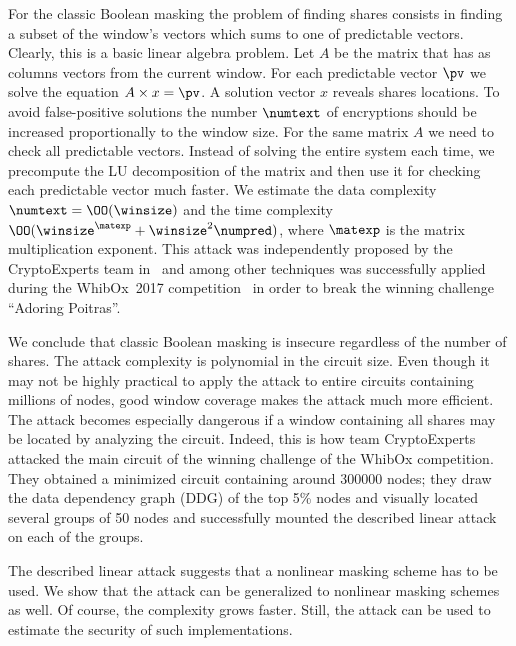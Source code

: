 

For the classic Boolean masking the problem of finding shares consists in finding a subset of the window's vectors which sums to one of predictable vectors. Clearly, this is a basic linear algebra problem. Let $A$ be the matrix that has as columns vectors from the current window. For each predictable vector $\pv$ we solve the equation $A \times x = \pv$. A solution vector $x$ reveals shares locations. To avoid false-positive solutions the number $\numtext$ of encryptions should be increased proportionally to the window size. For the same matrix $A$ we need to check all predictable vectors. Instead of solving the entire system each time, we precompute the LU decomposition of the matrix and then use it for checking each predictable vector much faster. We estimate the data complexity $\numtext = \OO(\winsize)$ and the time complexity $\OO(\winsize^\matexp + \winsize^2\numpred)$, where $\matexp$ is the matrix multiplication exponent. This attack was independently proposed by the CryptoExperts team in~\cite{cryptoexperts} and among other techniques was successfully applied~\cite{CHESawards} during the WhibOx~2017 competition~\cite{whibox} in order to break the winning challenge ``Adoring Poitras''.

We conclude that classic Boolean masking is insecure regardless of the number of shares. The attack complexity is polynomial in the circuit size. Even though it may not be highly practical to apply the attack to entire circuits containing millions of nodes, good window coverage makes the attack much more efficient. The attack becomes especially dangerous if a window containing all shares may be located by analyzing the circuit. Indeed, this is how team CryptoExperts attacked the main circuit of the winning challenge of the WhibOx competition. They obtained a minimized circuit containing around 300000 nodes; they draw the data dependency graph (DDG) of the top 5\% nodes and visually located several groups of 50 nodes and successfully mounted the described linear attack on each of the groups.




The described linear attack suggests that a nonlinear masking scheme has to be used. We show that the attack can be generalized to nonlinear masking schemes as well. Of course, the complexity grows faster. Still, the attack can be used to estimate the security of such implementations.

